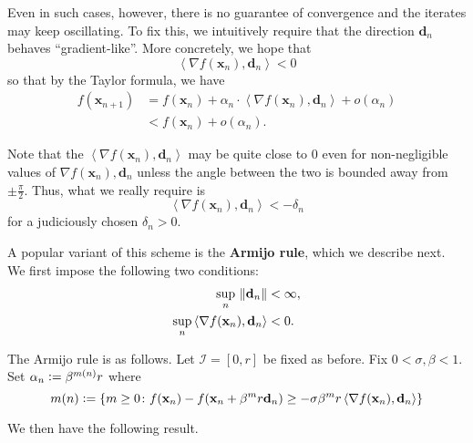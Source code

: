 Even in such cases, however, there is no guarantee of convergence and the iterates may keep oscillating. To fix this, we intuitively require that the direction $\mathbf{d}_n$ behaves ``gradient-like''. More concretely, we hope that
\[
    \left\langle \nabla f(\mathbf{x}_n), \mathbf{d}_n \right\rangle < 0
\]
so that by the Taylor formula, we have
\begin{align*}
    f(\mathbf{x}_{n+1}) &= f(\mathbf{x}_n) + \alpha_n \cdot \left\langle \nabla f(\mathbf{x}_n), \mathbf{d}_n \right\rangle + o(\alpha_n) \\
    &< f(\mathbf{x}_n) + o(\alpha_n).
\end{align*}

Note that the $\left\langle \nabla f(\mathbf{x}_n), \mathbf{d}_n \right\rangle$ may be quite close to $0$ even for non-negligible values of $\nabla f(\mathbf{x}_n), \mathbf{d}_n$ unless the angle between the two is bounded away from $\pm \frac{\pi}{2}$. Thus, what we really require is
\[
    \left\langle \nabla f(\mathbf{x}_n), \mathbf{d}_n \right\rangle < -\delta_n
\]
for a judiciously chosen $\delta_n > 0$.

A popular variant of this scheme is the \textbf{Armijo rule}, which we describe next. We first impose the following two conditions:
\begin{align*}
    \sup_n \, \norm{\mathbf{d}_n} &< \infty, \\
    \sup_n \left\langle \nabla f(\mathbf{x}_n), \mathbf{d}_n \right\rangle &< 0.
\end{align*}

The Armijo rule is as follows. Let $\mathcal{I} = [0,r]$ be fixed as before. Fix $0 < \sigma, \beta < 1$. Set $\alpha_n \vcentcolon= \beta^{m(n)} r$ where
\[
    m(n) \vcentcolon= \left\{ m \geq 0 \colon f(\mathbf{x}_n) - f(\mathbf{x}_n + \beta^m r \mathbf{d}_n) \geq -\sigma \beta^m r \left\langle \nabla f(\mathbf{x}_n), \mathbf{d}_n \right\rangle  \right\}
\]

We then have the following result.


